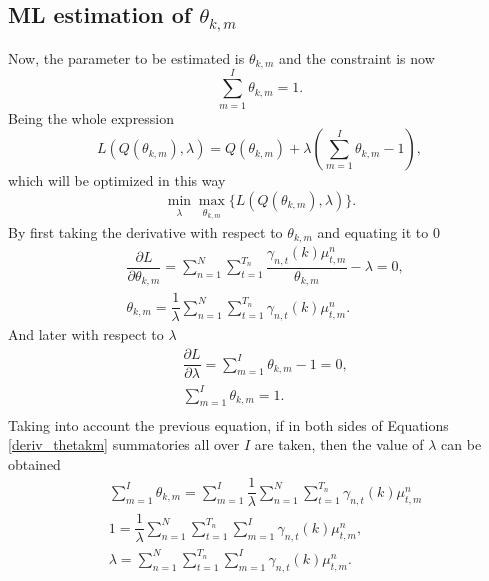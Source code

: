 \documentclass[12pt]{article}
\begin{document}
\subsection{ML estimation of $\theta_{k,m}$}
Now, the parameter to be estimated is $\theta_{k,m}$ and the constraint is now
\begin{equation}
\label{constraint_thetakm}
\sum \limits_{m=1}^{I} \theta_{k,m} = 1.
\end{equation}
Being the whole expression
\begin{equation}
\label{lagrange_thetakm}
L\left( Q(\theta_{k,m}),\lambda \right) = Q(\theta_{k,m}) + \lambda \left( \sum \limits_{m=1}^{I} \theta_{k,m} - 1 \right),
\end{equation}
which will be optimized in this way
\begin{equation}
\label{minmax_lagrange_thetakm}
\min_{\substack{\lambda}} \max_{\substack{\theta_{k,m}}} \lbrace L\left( Q(\theta_{k,m}),\lambda \right) \rbrace.
\end{equation}
By first taking the derivative with respect to $\theta_{k,m}$ and equating it to 0
\begin{equation}
\label{deriv_thetakm}
\begin{split}
& \dfrac{\partial L}{\partial \theta_{k,m}} = \sum \limits_{n=1}^{N}\sum _ { t = 1 } ^ { T _ { n } } \dfrac{\gamma_{n,t}(k)\mu_{t,m}^{n}}{\theta_{k,m}} - \lambda  = 0 , \\
& \theta_{k,m} = \dfrac{1}{\lambda} \sum \limits_{n=1}^{N} \sum _ { t = 1 } ^ { T _ { n } }\gamma_{n,t}(k)\mu_{t,m}^{n}.
\end{split}
\end{equation}
And later with respect to $\lambda$
\begin{equation}
\begin{split}
& \dfrac{\partial L}{\partial \lambda} = \sum \limits_{m=1}^{I} \theta_{k,m} - 1 = 0,\\
& \sum \limits_{m=1}^{I} \theta_{k,m} = 1.\\
\end{split}
\end{equation}
Taking into account the previous equation, if in both sides of Equations \ref{deriv_thetakm} summatories all over $I$ are taken, then the value of $\lambda$ can be obtained
\begin{equation}
\begin{split}
& \sum \limits_{m=1}^{I}\theta_{k,m} = \sum \limits_{m=1}^{I} \dfrac{1}{\lambda} \sum \limits_{n=1}^{N}\sum _ { t = 1 } ^ { T _ { n } } \gamma_{n,t}(k)\mu_{t,m}^{n}\\
& 1 = \dfrac{1}{\lambda} \sum \limits_{n=1}^{N}\sum _ { t = 1 } ^ { T _ { n } }\sum \limits_{m=1}^{I}\gamma_{n,t}(k)\mu_{t,m}^{n},\\
& \lambda = \sum \limits_{n=1}^{N}\sum \limits_{ t = 1 } ^ { T _ { n }}\sum \limits_{m=1}^{I}\gamma_{n,t}(k)\mu_{t,m}^{n}.\\
\end{split}
\end{equation}
\end{document}
